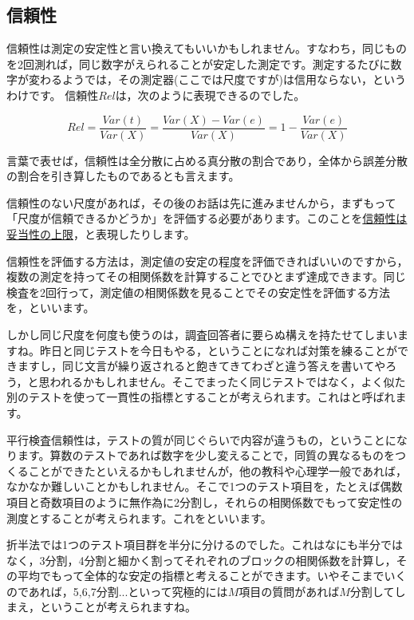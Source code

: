 \documentclass{ltjsbook}
\begin{document}
\subsection{信頼性}
信頼性は測定の安定性と言い換えてもいいかもしれません。すなわち，同じものを2回測れば，同じ数字がえられることが安定した測定です。測定するたびに数字が変わるようでは，その測定器(ここでは尺度ですが)は信用ならない，というわけです。
信頼性$Rel$は，次のように表現できるのでした。

\[Rel = \frac{Var(t)}{Var(X)}= \frac{Var(X)-Var(e)}{Var(X)} = 1-\frac{Var(e)}{Var(X)}\]

言葉で表せば，信頼性は全分散に占める真分散の割合であり，全体から誤差分散の割合を引き算したものであるとも言えます。

信頼性のない尺度があれば，その後のお話は先に進みませんから，まずもって「尺度が信頼できるかどうか」を評価する必要があります。このことを\underline{信頼性は妥当性の上限}，と表現したりします。

信頼性を評価する方法は，測定値の安定の程度を評価できればいいのですから，複数の測定を持ってその相関係数を計算することでひとまず達成できます。同じ検査を2回行って，測定値の相関係数を見ることでその安定性を評価する方法を，といいます。

しかし同じ尺度を何度も使うのは，調査回答者に要らぬ構えを持たせてしまいますね。昨日と同じテストを今日もやる，ということになれば対策を練ることができますし，同じ文言が繰り返されると飽きてきてわざと違う答えを書いてやろう，と思われるかもしれません。そこでまったく同じテストではなく，よく似た別のテストを使って一貫性の指標とすることが考えられます。これはと呼ばれます。

平行検査信頼性は，テストの質が同じぐらいで内容が違うもの，ということになります。算数のテストであれば数字を少し変えることで，同質の異なるものをつくることができたといえるかもしれませんが，他の教科や心理学一般であれば，なかなか難しいことかもしれません。そこで1つのテスト項目を，たとえば偶数項目と奇数項目のように無作為に2分割し，それらの相関係数でもって安定性の測度とすることが考えられます。これをといいます。

折半法では1つのテスト項目群を半分に分けるのでした。これはなにも半分ではなく，3分割，4分割と細かく割ってそれぞれのブロックの相関係数を計算し，その平均でもって全体的な安定の指標と考えることができます。いやそこまでいくのであれば，5,6,7分割...といって究極的には$M$項目の質問があれば$M$分割してしまえ，ということが考えられますね。
\end{document}

